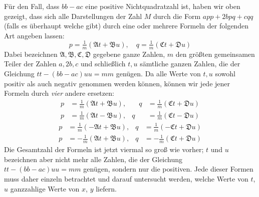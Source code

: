 Für den Fall, dass $bb-ac$ eine positive Nichtquadratzahl ist, haben wir oben gezeigt, dass sich alle Darstellungen der Zahl $M$ durch die Form $app+2bpq+cqq$ (falls es überhaupt welche gibt) durch eine oder mehrere Formeln der folgenden Art angeben lassen:
\[
p=\tfrac{1}{m}(\mathfrak{A}t+\mathfrak{B}u),\quad q=\tfrac{1}{m}(\mathfrak{C}t+\mathfrak{D}u)
\]
Dabei bezeichnen $\mathfrak{A},\mathfrak{B},\mathfrak{C},\mathfrak{D}$ gegebene ganze Zahlen, $m$ den größten gemeinsamen Teiler der Zahlen $a,2b,c$ und schließlich $t,u$ sämtliche ganzen Zahlen, die der Gleichung $tt-(bb-ac)uu=mm$ genügen. Da alle Werte von $t,u$ sowohl positiv als auch negativ genommen werden können, können wir jede jener Formeln durch \textit{vier} andere ersetzen:
\[
\begin{aligned}
p&=\tfrac{1}{m}(\mathfrak{A}t+\mathfrak{B}u), &\quad q&=\tfrac{1}{m}(\mathfrak{C}t+\mathfrak{D}u)\\
p&=\tfrac{1}{m}(\mathfrak{A}t-\mathfrak{B}u), &q&=\tfrac{1}{m}(\mathfrak{C}t-\mathfrak{D}u)
\end{aligned}
\]
\[
\begin{aligned}
p&=\tfrac{1}{m}(-\mathfrak{A}t+\mathfrak{B}u),&
q&=\tfrac{1}{m}(-\mathfrak{C}t+\mathfrak{D}u)\\
p&=-\tfrac{1}{m}(\mathfrak{A}t+\mathfrak{B}u),&
q&=-\tfrac{1}{m}(\mathfrak{C}t+\mathfrak{D}u)
\end{aligned}
\]
Die Gesamtzahl der Formeln ist jetzt viermal so groß wie vorher; $t$ und $u$ bezeichnen aber nicht mehr alle Zahlen, die der Gleichung $tt-(bb-ac)uu=mm$ genügen, sondern nur die positiven. Jede dieser Formen muss daher einzeln betrachtet und darauf untersucht werden, welche Werte von $t$, $u$ ganzzahlige Werte von $x$, $y$ liefern.

